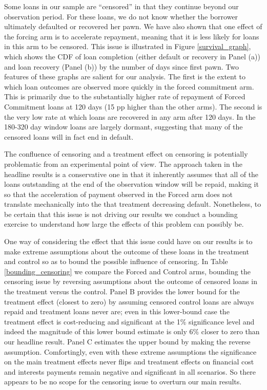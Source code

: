 \begin{appendix}
Some loans in our sample are ``censored'' in that they continue beyond our observation period.  For these loans, we do not know whether the borrower ultimately defaulted or recovered her pawn.   We have also shown that one effect of the forcing arm is to accelerate repayment, meaning that it is less likely for loans in this arm to be censored.  This issue is illustrated in Figure \ref{survival_graph}, which shows the CDF of loan completion (either default or recovery in Panel (a)) and loan recovery (Panel (b)) by the number of days since first pawn.  Two features of these graphs are salient for our analysis.  The first is the extent to which loan outcomes are observed more quickly in the forced commitment arm.  This is primarily due to the substantially higher rate of repayment of Forced Commitment loans at 120 days (15 pp higher than the other arms).  The second is the very low rate at which loans are recovered in any arm after 120 days.  In the 180-320 day window loans are largely dormant, suggesting that many of the censored loans will in fact end in default.

The confluence of censoring and a treatment effect on censoring is potentially problematic from an experimental point of view.  The approach taken in the headline results is a conservative one in that it inherently assumes that all of the loans outstanding at the end of the observation window will be repaid, making it so that the acceleration of payment observed in the Forced arm does not translate mechanically into the that treatment decreasing default.  Nonetheless, to be certain that this issue is not driving our results we conduct a bounding exercise to understand how large the effects of this problem can possibly be.  

One way of considering the effect that this issue could have on our results is to make extreme assumptions about the outcome of these loans in the treatment and control so as to bound the possible influence of censoring. In Table \ref{bounding_censoring} we compare the Forced and Control arms, bounding the censoring issue by reversing assumptions about the outcome of censored loans in the treatment versus the control.   Panel B provides the lower bound for the treatment effect (closest to zero) by assuming censored control loans are always repaid and treatment loans never are; even in this lower-bound case the treatment effect is cost-reducing and significant at the 1\% significance level and indeed the magnitude of this lower bound estimate is only 6\% closer to zero than our headline result.   Panel C estimates the upper bound by making the reverse assumption.  Comfortingly, even with these extreme assumptions the significance on the main treatment effects never flips and treatment effects on financial cost and interests payments remain negative and significant in all scenarios.  So there appears to be no scope for the censoring issue to overturn our main results. 


\end{appendix}
